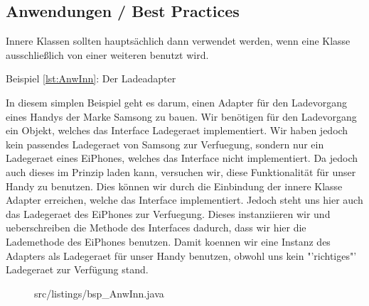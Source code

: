 \subsection{Anwendungen / Best Practices}

Innere Klassen sollten hauptsächlich dann verwendet werden, wenn eine Klasse ausschließlich von einer weiteren benutzt wird.

Beispiel \ref{lst:AnwInn}: Der Ladeadapter

In diesem simplen Beispiel geht es darum, einen Adapter für den Ladevorgang eines Handys der Marke Samsong zu bauen.
Wir benötigen für den Ladevorgang ein Objekt, welches das Interface Ladegeraet implementiert.
Wir haben jedoch kein passendes Ladegeraet von Samsong zur Verfuegung, sondern nur ein Ladegeraet eines EiPhones, welches das Interface nicht implementiert.
Da jedoch auch dieses im Prinzip laden kann, versuchen wir, diese Funktionalität für unser Handy zu benutzen.
Dies können wir durch die Einbindung der innere Klasse Adapter erreichen, welche das Interface implementiert.
Jedoch steht uns hier auch das Ladegeraet des EiPhones zur Verfuegung.
Dieses instanziieren wir und ueberschreiben die Methode des Interfaces dadurch, dass wir hier die Lademethode des EiPhones benutzen.
Damit koennen wir eine Instanz des Adapters als Ladegeraet für unser Handy benutzen, obwohl uns kein "'richtiges"' Ladegeraet zur Verfügung stand.

\newpage
\begin{figure}[hb]
\lstset{language=Java}
 {src/listings/bsp_AnwInn.java}
\end{figure}


\newpage

